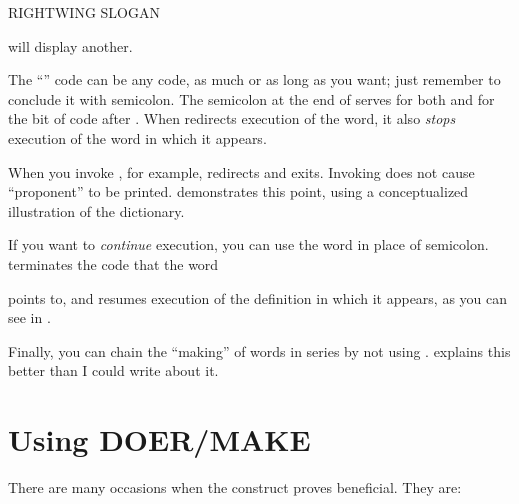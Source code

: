 \begin{Code}
RIGHTWING SLOGAN
\end{Code}
will display another.

The ``'' code can be any \Forth{} code, as much or as long as
you want; just remember to conclude it with semicolon. The semicolon at
the end of  serves for both  and for the bit of
code after . When  redirects execution of the  word,
it also \emph{stops} execution of the word in which it appears.

When you invoke , for example,  redirects
 and exits. Invoking  does not cause ``proponent''
to be printed.  demonstrates this point, using a
conceptualized illustration of the dictionary.

If you want to \emph{continue} execution, you can use the word  in
place of semicolon.  terminates the code that the  word



points to, and resumes execution of the definition in which it appears, as
you can see in .

Finally, you can chain the ``making'' of  words in series by
not using .  explains this better than I could write about
it.

\section{Using DOER/MAKE}

There are many occasions when the  construct proves
beneficial. They are:

